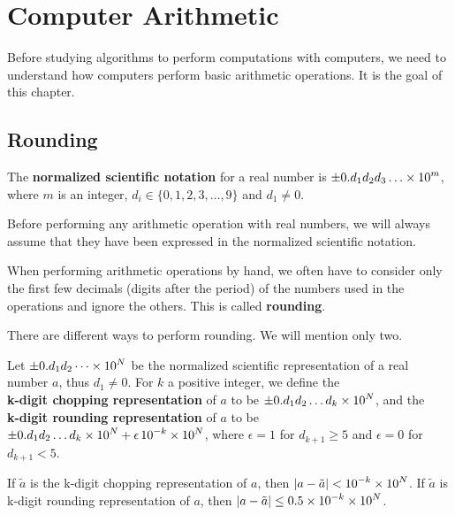 \chapter{Computer Arithmetic}\label{chaptArith}

Before studying algorithms to perform computations with computers, we
need to understand how computers perform basic arithmetic operations.
It is the goal of this chapter.

\section{Rounding}

\begin{defn}
The {\bfseries normalized scientific notation} for a real number is
$\displaystyle \pm 0.d_1d_2d_3\ldots \times 10^m$, where $m$ is an
integer, $d_i \in \{0,1,2,3,\ldots,9\}$ and $d_1 \neq 0$.
\end{defn}

Before performing any arithmetic operation with real numbers, we will
always assume that they have been expressed in the normalized
scientific notation.

When performing arithmetic operations by hand, we often have to
consider only the first few decimals (digits after the period) of the
numbers used in the operations and ignore the others.  This is called
{\bfseries rounding}.

There are different ways to perform rounding.  We will mention only
two.

\begin{defn}
Let $\displaystyle \pm 0.d_1 d_2 \dots \times 10^N$ be the normalized scientific
representation of a real number $a$, thus $d_1 \neq 0$.  For $k$ a
positive integer, we define the\\
{\bfseries k-digit chopping representation} of $a$ to be
$\displaystyle \pm 0.d_1 d_2 \dots d_k \times 10^N$, and the\\
{\bfseries k-digit rounding representation} of $a$ to be
$\displaystyle \pm 0.d_1 d_2 \dots d_k \times 10^N + \epsilon \,
10^{-k} \times 10^N$,
where $\epsilon = 1$ for $d_{k+1}\geq 5$ and $\epsilon = 0$ for
$d_{k+1} < 5$.
\end{defn}

If $\tilde{a}$ is the k-digit chopping representation of $a$, then
$\displaystyle |a-\tilde{a}| < 10^{-k}\times 10^N$.  If $\tilde{a}$ is 
k-digit rounding representation of $a$, then
$\displaystyle |a-\tilde{a}| \leq 0.5 \times 10^{-k}\times 10^N$.

